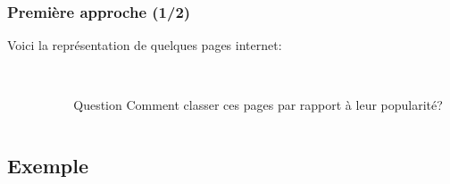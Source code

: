 \documentclass{beamer}
\begin{document}
\begin{frame}
  \frametitle{Première approche (1/2)}
  
  Voici la représentation de quelques pages internet:\\\ \\
  \pause
  \begin{columns}
    \begin{column}[l]{0.05\linewidth}
      \phantom{``e''}
    \end{column}
    \begin{column}[c]{0.45\linewidth}
      \begin{minipage}{0.45\linewidth}
        
      \end{minipage}
    \end{column}
    \begin{column}[r]{0.5\linewidth}
      \begin{minipage}[t]{0.5\linewidth}
        \pause
        \begin{block}{Question}
          Comment classer ces pages par rapport à leur popularité?
        \end{block}
        \end{minipage}
    \end{column}
  \end{columns}
 
 
\end{frame}

\subsection{Exemple}
\end{document}
